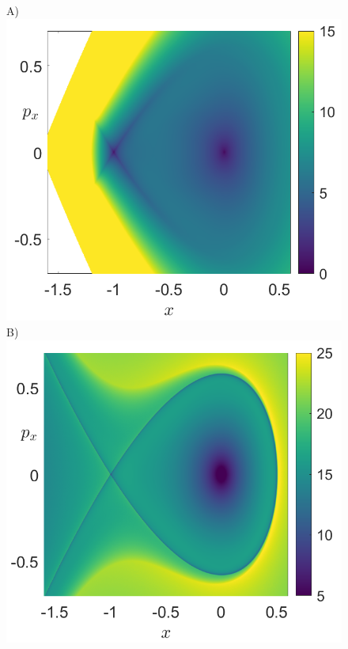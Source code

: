 \documentclass[8pt]{article}
\begin{document}
\bigskip
\bigskip
\bigskip
\bigskip

\begin{figure}[htbp]
	\begin{center}
		A)\includegraphics[scale=0.24]{LDfixTime_p_05_fishPot_tau_3.png}
		B)\includegraphics[scale=0.24]{LD_p_05_fishPot_tau_8.png}

\end{center}
\end{figure}
\end{document}
